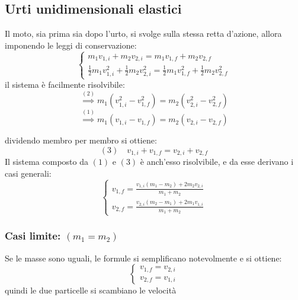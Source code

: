 \documentclass[11pt, a4paper, openright]{book}
\theoremstyle{plain}
\theoremstyle{definition}
\begin{document}
\newpage

\subsection{Urti unidimensionali elastici}
Il moto, sia prima sia dopo l'urto, si svolge sulla stessa retta d'azione, allora imponendo le leggi di conservazione:
\begin{equation}
    \begin{cases}
        \displaystyle m_1v_{1, i} + m_2v_{2, i} = m_1v_{1, f} + m_2v_{2, f} \\
        \displaystyle \frac{1}{2}m_1v^2_{1, i} + \frac{1}{2}m_2v^2_{2, i} = \frac{1}{2}m_1v^2_{1, f} + \frac{1}{2}m_2v^2_{2, f}
    \end{cases}
\end{equation}
il sistema è facilmente risolvibile:
\begin{equation}
    \overset{(2)}{\implies} m_1(v^2_{1, i} - v^2_{1, f}) =  m_2(v^2_{2, i} - v^2_{2, f})
\end{equation}
\begin{equation}
    \overset{(1)}{\implies} m_1(v_{1, i} - v_{1, f}) =  m_2(v_{2, i} - v_{2, f})
\end{equation}

dividendo membro per membro si ottiene:
\begin{equation}
    (3) \quad v_{1, i} + v_{1, f} = v_{2, i} + v_{2, f}
\end{equation}
Il sistema composto da $(1)$ e $(3)$ è anch'esso risolvibile, e da esse derivano i casi generali:
\begin{equation}
    \begin{cases}
        v_{1, f} = \frac{v_{1, i}(m_1 - m_2) + 2m_2v_{2, i}}{m_1 + m_2} \\
        v_{2, f} = \frac{v_{2, i}(m_2 - m_1) + 2m_1v_{1, i}}{m_1 + m_2}
    \end{cases}
\end{equation}

\subsubsection{Casi limite: $(m_1 = m_2)$}
Se le masse sono uguali, le formule si semplificano notevolmente e si ottiene:
\begin{equation}
    \begin{cases}
        v_{1, f} = v_{2, i} \\
        v_{2, f} = v_{1, i}
    \end{cases}
\end{equation}
quindi le due particelle si scambiano le velocità
\end{document}
